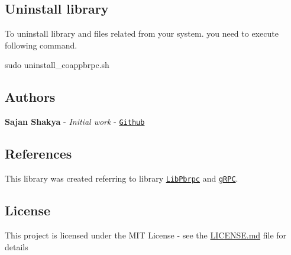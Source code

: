 \subsection*{Uninstall library}

To uninstall library and files related from your system. you need to execute following command. 
\begin{DoxyCode}
sudo uninstall\_coappbrpc.sh
\end{DoxyCode}


\subsection*{Authors}


\begin{DoxyItemize}
\item {\bfseries Sajan Shakya} -\/ {\itshape Initial work} -\/ \href{https://github.com/sajanshakya129}{\tt Github}
\end{DoxyItemize}

\subsection*{References}

This library was created referring to library \href{https://github.com/madwyn/libpbrpc}{\tt Lib\+Pbrpc} and \href{https://grpc.io/}{\tt g\+R\+PC}.

\subsection*{License}

This project is licensed under the M\+IT License -\/ see the \hyperlink{md_LICENSE}{L\+I\+C\+E\+N\+SE.md} file for details 